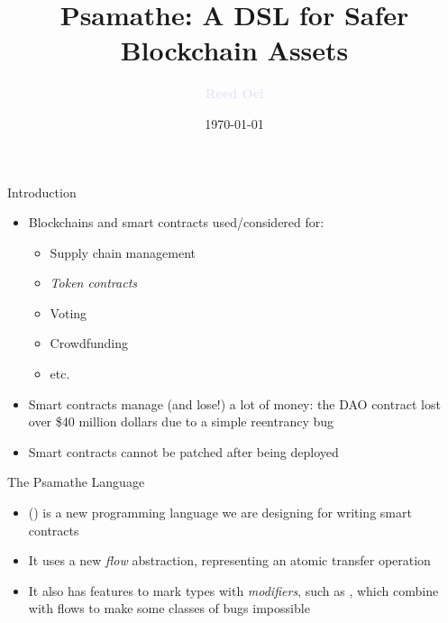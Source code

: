 \documentclass[leqno,presentation,usenames,dvipsnames]{beamer}
\title{Psamathe: A DSL for Safer Blockchain Assets}
\author{\textcolor{lavender}{\textbf{Reed Oei}}}
\institute{University of Illinois, Urbana, US\\
\url{reedoei2@illinois.edu}}
\date{\small \today}
\begin{document}
\frame{\titlepage}

\begin{frame}{Introduction}
    \begin{itemize}
        \item Blockchains and smart contracts used/considered for:
            \begin{itemize}
                \item Supply chain management
                \item \emph{Token contracts}
                \item Voting
                \item Crowdfunding
                \item etc.
            \end{itemize}

        \item Smart contracts manage (and lose!) a lot of money: the DAO contract lost over \$40 million dollars due to a simple reentrancy bug

        \item Smart contracts cannot be patched after being deployed
    \end{itemize}
\end{frame}

\begin{frame}[fragile]{The Psamathe Language}
    \begin{itemize}
        \item \textcolor{softRed}{\textbf{\langName}} (\langNamePronounce) is a new programming language we are designing for writing smart contracts
        \item It uses a new \emph{flow} abstraction, representing an atomic transfer operation
        \item It also has features to mark types with \emph{modifiers}, such as , which combine with flows to make some classes of bugs impossible
    \end{itemize}

    
\end{frame}
\end{document}

